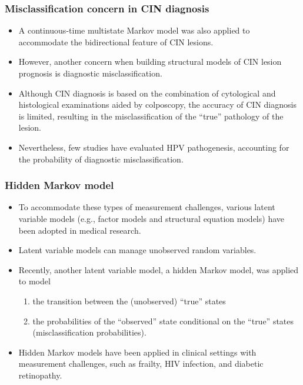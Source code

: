 \documentclass[aspectratio=169, 12pt]{beamer}
\begin{document}
	\begin{frame}
	\frametitle{Misclassification concern in CIN diagnosis}
	\begin{itemize}
	\item A continuous-time multistate Markov model was also applied to accommodate the bidirectional feature of CIN lesions.
	\item However, another concern when building structural models of CIN lesion prognosis is diagnostic misclassification.
	\item Although CIN diagnosis is based on the combination of cytological and histological examinations aided by colposcopy, the accuracy of CIN diagnosis is limited, resulting in the misclassification of the ``true'' pathology of the lesion.
	\item Nevertheless, few studies have evaluated HPV pathogenesis, accounting for the probability of diagnostic misclassification.

	\end{itemize}
	\end{frame}

	\begin{frame}
	\frametitle{Hidden Markov model}
	\begin{itemize}
	\item To accommodate these types of measurement challenges, various latent variable models (e.g., factor models and structural equation models) have been adopted in medical research.
	\item Latent variable models can manage unobserved random variables.
	\item Recently, another latent variable model, a hidden Markov model, was applied to model 
	\begin{enumerate}
	\item the transition between the (unobserved) ``true'' states
	\item the probabilities of the ``observed'' state conditional on the ``true'' states (misclassification probabilities).
	\end{enumerate}
	\item Hidden Markov models have been applied in clinical settings with measurement challenges, such as frailty, HIV infection, and diabetic retinopathy.

	\end{itemize}
	\end{frame}
\end{document}
